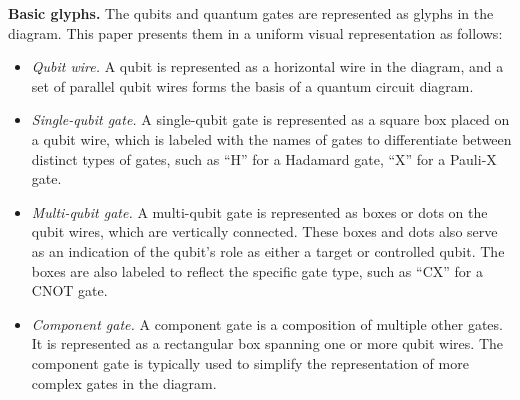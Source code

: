 \textbf{Basic glyphs.}
The qubits and quantum gates are represented as glyphs in the diagram.
This paper presents them in a uniform visual representation as follows:
\begin{itemize}
    \item[\icon{qubit}]
     \emph{Qubit wire.}
      A qubit is represented as a horizontal wire in the diagram, %
      and a set of parallel qubit wires forms the basis of a quantum circuit diagram.

    \item[\icon{singlegate}]
     \emph{Single-qubit gate.}
     A single-qubit gate is represented as a square box placed on a qubit wire, which is labeled with the names of gates to differentiate between distinct types of gates, such as ``H'' for a Hadamard gate, ``X'' for a Pauli-X gate.
    
    \item[\icon{multigate}] \emph{Multi-qubit gate.}
      A multi-qubit gate is represented as boxes or dots on the qubit wires, which are vertically connected.
      These boxes and dots also serve as an indication of the qubit's role as either a target or controlled qubit. 
      The boxes are also labeled to reflect the specific gate type, such as ``CX'' for a CNOT gate.
    
    \item[\icon{component}] \emph{Component gate.}
    A component gate is a composition of multiple other gates.
    It is represented as a rectangular box spanning one or more qubit wires.
    The component gate is typically used to simplify the representation of more complex gates in the diagram.
\end{itemize}


